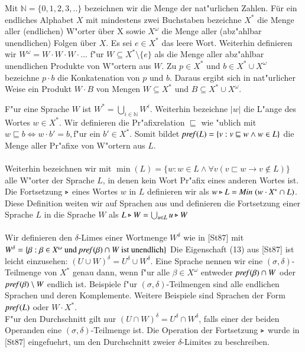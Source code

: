 Mit $\mathbb{N}=\{0,1,2,3,..\}$ bezeichnen wir die Menge der nat"urlichen Zahlen. 
Für ein endliches Alphabet $X$ mit mindestens zwei Buchstaben bezeichne $X^*$ die Menge aller (endlichen) W"orter über X sowie $X^\omega$ die Menge aller (abz"ahlbar unendlichen) Folgen über $X$.
Es sei $e\in X^*$ das leere Wort. Weiterhin definieren wir $W^\omega = W\cdot W\cdot W \cdot ...$ f"ur $W\subseteq X^*\setminus \{e\}$ als die Menge aller abz"ahlbar unendlichen Produkte von W"ortern aus $W$.
Zu $p\in X^*$ und $b\in X^*\cup X^\omega$ bezeichne $p\cdot b$ die Konkatenation von $p$ und $b$. Daraus ergibt sich in nat"urlicher Weise ein Produkt $W\cdot B$ von Mengen $W\subseteq X^*$ und $B\subseteq X^*\cup X^\omega$.

F"ur eine Sprache $W$ ist $W^*=\bigcup_{i\in\mathbb{N}} W^i$. Weiterhin bezeichne $\vert w\vert$ die L"ange des Wortes $w\in X^*$.
Wir definieren die Pr"afixrelation $\sqsubseteq$ wie "ublich mit $w\sqsubseteq b \Leftrightarrow w\cdot b' = b,$f"ur ein $b'\in X^*$.
Somit bildet $\mathit{pref{(}}L) = \{v:v\sqsubseteq w \wedge w\in L\}$ die Menge aller Pr"afixe von W"ortern aus $L$.\\\\
Weiterhin bezeichnen wir mit $\min(L) = \{w:w\in L \wedge \forall v( v\sqsubset w \to v\notin L)\}$ alle W"orter der Sprache $L$, in denen kein Wort Pr"afix eines anderen Wortes ist.
Die Fortsetzung $\triangleright$ eines Wortes $w$ in $L$ definieren wir als $w\triangleright L = \mathit{Min}\;(w\cdot X^* \cap L)$. Diese Definition weiten wir auf Sprachen aus und definieren
die Fortsetzung einer Sprache $L$ in die Sprache $W$ als $L\triangleright W = \bigcup_{u\in L} u\triangleright W$\\\\
Wir definieren den $\delta$-Limes einer Wortmenge $W ^\delta$ wie in [St87] mit\\$W^\delta = \{\beta : \beta \in X^\omega \text{ und }\mathit{pref{(}}\beta)\cap W \text{ ist unendlich}\}$
Die Eigenschaft (13) aus [St87] ist leicht einzusehen: $(U \cup W)^\delta = U^\delta \cup W^\delta$.	Eine Sprache nennen wir eine $(\sigma,\delta)$-Teilmenge von $X^*$ genau dann, wenn f"ur alle $\beta \in X^\omega$ entweder $\mathit{pref{(}}\beta)\cap W$ oder $\mathit{pref{(}}\beta)\setminus W$ endlich ist.
Beispiele f"ur $(\sigma,\delta)$-Teilmengen sind alle endlichen Sprachen und deren Komplemente. Weitere Beispiele sind Sprachen der Form $\mathit{pref{(}}L)$ oder $W\cdot X^*$.\\
F"ur den Durchschnitt gilt nur $(U\cap W)^\delta = U^\delta \cap W^\delta$, falls einer der beiden Operanden eine $(\sigma,\delta)$-Teilmenge ist.
Die Operation der Fortsetzung $\triangleright$ wurde in [St87] eingefuehrt, um den Durchschnitt zweier $\delta$-Limites zu beschreiben.
